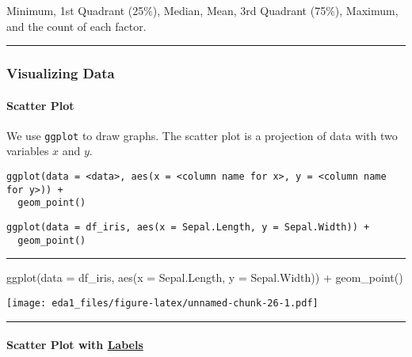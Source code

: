 \documentclass[
]{article}
\newenvironment{Shaded}{\begin{snugshade}}{\end{snugshade}}
\newcommand{\AttributeTok}[1]{\textcolor[rgb]{0.77,0.63,0.00}{#1}}
\newcommand{\FunctionTok}[1]{\textcolor[rgb]{0.00,0.00,0.00}{#1}}
\newcommand{\NormalTok}[1]{#1}
\newcommand{\SpecialCharTok}[1]{\textcolor[rgb]{0.00,0.00,0.00}{#1}}
\begin{document}
Minimum, 1st Quadrant (25\%), Median, Mean, 3rd Quadrant (75\%),
Maximum, and the count of each factor.

\begin{center}\rule{0.5\linewidth}{0.5pt}\end{center}

\hypertarget{visualizing-data}{%
\subsubsection{Visualizing Data}\label{visualizing-data}}

\hypertarget{scatter-plot}{%
\paragraph{Scatter Plot}\label{scatter-plot}}

We use \texttt{ggplot} to draw graphs. The scatter plot is a projection
of data with two variables \(x\) and \(y\).

\begin{verbatim}
ggplot(data = <data>, aes(x = <column name for x>, y = <column name for y>)) +
  geom_point()
\end{verbatim}

\begin{verbatim}
ggplot(data = df_iris, aes(x = Sepal.Length, y = Sepal.Width)) +
  geom_point()
\end{verbatim}

\begin{center}\rule{0.5\linewidth}{0.5pt}\end{center}

\begin{Shaded}
\begin{Highlighting}[]
\FunctionTok{ggplot}\NormalTok{(}\AttributeTok{data =}\NormalTok{ df\_iris, }\FunctionTok{aes}\NormalTok{(}\AttributeTok{x =}\NormalTok{ Sepal.Length, }\AttributeTok{y =}\NormalTok{ Sepal.Width)) }\SpecialCharTok{+}
  \FunctionTok{geom\_point}\NormalTok{()}
\end{Highlighting}
\end{Shaded}

\texttt{[image: eda1\_files/figure-latex/unnamed-chunk-26-1.pdf]}

\begin{center}\rule{0.5\linewidth}{0.5pt}\end{center}

\hypertarget{scatter-plot-with-labels}{%
\paragraph{\texorpdfstring{Scatter Plot with
\href{https://ggplot2.tidyverse.org/reference/labs.html}{Labels}}{Scatter Plot with Labels}}\label{scatter-plot-with-labels}}
\end{document}
